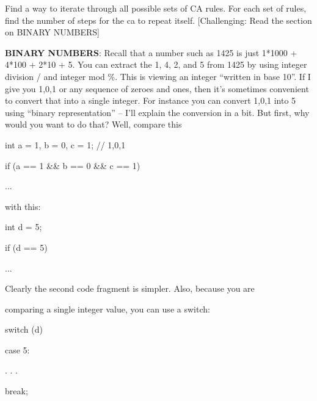 Find a way to iterate through all possible sets of CA rules. For each set of rules, find the number of steps for the ca to repeat itself. [Challenging: Read the section on BINARY NUMBERS]



\textbf{BINARY NUMBERS}: Recall that a number such as 1425 is just 1*1000 + 4*100 + 2*10 + 5. You can extract the 1, 4, 2, and 5 from 1425 by using integer division / and integer mod \%. This is viewing an integer ``written in base 10''. If I give you 1,0,1 or any sequence of zeroes and ones, then it's sometimes convenient to convert that into a single integer. For instance you can convert 1,0,1 into 5 using ``binary representation'' -- I'll explain the conversion in a bit. But first, why would you want to do that? Well, compare this



\begin{console}

int a = 1, b = 0, c = 1; // 1,0,1



if (a == 1 && b == 0 && c == 1)



{



...



}

\end{console}

with this:

\begin{console}

int d = 5;



if (d == 5)



{



...



}

\end{console}

Clearly the second code fragment is simpler. Also, because you are

comparing a single integer value, you can use a switch:

\begin{console}

switch (d)



{



case 5:



. . .



break;

}

\end{console}



